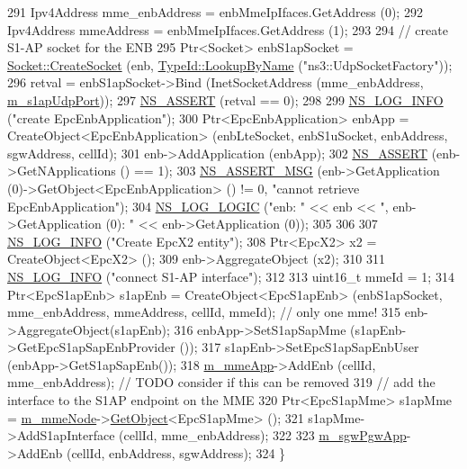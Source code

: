 \begin{DoxyCode}
291   Ipv4Address mme\_enbAddress = enbMmeIpIfaces.GetAddress (0);
292   Ipv4Address mmeAddress = enbMmeIpIfaces.GetAddress (1);
293 
294   \textcolor{comment}{// create S1-AP socket for the ENB}
295   Ptr<Socket> enbS1apSocket = \hyperlink{classns3_1_1Socket_ad448a62bb50ad3dbac59c879a885a8d2}{Socket::CreateSocket} (enb, 
      \hyperlink{classns3_1_1TypeId_a119cf99c20931fdc294602cd360b180e}{TypeId::LookupByName} (\textcolor{stringliteral}{"ns3::UdpSocketFactory"}));
296   retval = enbS1apSocket->Bind (InetSocketAddress (mme\_enbAddress, \hyperlink{classns3_1_1EmuEpcHelper_a40b9bb46dee69ea02ffe0722b462db8e}{m\_s1apUdpPort}));
297   \hyperlink{assert_8h_a6dccdb0de9b252f60088ce281c49d052}{NS\_ASSERT} (retval == 0);
298 
299   \hyperlink{group__logging_gafbd73ee2cf9f26b319f49086d8e860fb}{NS\_LOG\_INFO} (\textcolor{stringliteral}{"create EpcEnbApplication"});
300   Ptr<EpcEnbApplication> enbApp = CreateObject<EpcEnbApplication> (enbLteSocket, enbS1uSocket, enbAddress, 
      sgwAddress, cellId);
301   enb->AddApplication (enbApp);
302   \hyperlink{assert_8h_a6dccdb0de9b252f60088ce281c49d052}{NS\_ASSERT} (enb->GetNApplications () == 1);
303   \hyperlink{assert_8h_aff5ece9066c74e681e74999856f08539}{NS\_ASSERT\_MSG} (enb->GetApplication (0)->GetObject<EpcEnbApplication> () != 0, \textcolor{stringliteral}{"cannot
       retrieve EpcEnbApplication"});
304   \hyperlink{group__logging_ga88acd260151caf2db9c0fc84997f45ce}{NS\_LOG\_LOGIC} (\textcolor{stringliteral}{"enb: "} << enb << \textcolor{stringliteral}{", enb->GetApplication (0): "} << enb->GetApplication (0));
305 
306   
307   \hyperlink{group__logging_gafbd73ee2cf9f26b319f49086d8e860fb}{NS\_LOG\_INFO} (\textcolor{stringliteral}{"Create EpcX2 entity"});
308   Ptr<EpcX2> x2 = CreateObject<EpcX2> ();
309   enb->AggregateObject (x2);
310 
311   \hyperlink{group__logging_gafbd73ee2cf9f26b319f49086d8e860fb}{NS\_LOG\_INFO} (\textcolor{stringliteral}{"connect S1-AP interface"});
312 
313   uint16\_t mmeId = 1;
314   Ptr<EpcS1apEnb> s1apEnb = CreateObject<EpcS1apEnb> (enbS1apSocket, mme\_enbAddress, mmeAddress, cellId, 
      mmeId); \textcolor{comment}{// only one mme!}
315   enb->AggregateObject(s1apEnb);
316   enbApp->SetS1apSapMme (s1apEnb->GetEpcS1apSapEnbProvider ());
317   s1apEnb->SetEpcS1apSapEnbUser (enbApp->GetS1apSapEnb());
318   \hyperlink{classns3_1_1EmuEpcHelper_a20264a8bd8b295161b08d09e4794f02f}{m\_mmeApp}->AddEnb (cellId, mme\_enbAddress); \textcolor{comment}{// TODO consider if this can be removed}
319   \textcolor{comment}{// add the interface to the S1AP endpoint on the MME}
320   Ptr<EpcS1apMme> s1apMme = \hyperlink{classns3_1_1EmuEpcHelper_aef136870f0ad1c40d3e139f34ff9f5d1}{m\_mmeNode}->\hyperlink{classns3_1_1Object_a13e18c00017096c8381eb651d5bd0783}{GetObject}<EpcS1apMme> ();
321   s1apMme->AddS1apInterface (cellId, mme\_enbAddress);
322   
323   \hyperlink{classns3_1_1EmuEpcHelper_a9f3619ec9e8725d4fbb9794a4f21aaa4}{m\_sgwPgwApp}->AddEnb (cellId, enbAddress, sgwAddress);
324 \}
\end{DoxyCode}


